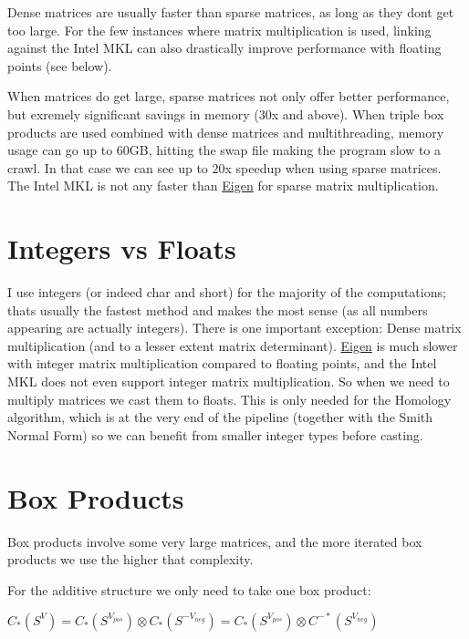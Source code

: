 \begin{DoxyItemize}
\item Dense matrices are usually faster than sparse matrices, as long as they don\textquotesingle{}t get too large. For the few instances where matrix multiplication is used, linking against the Intel M\+KL can also drastically improve performance with floating points (see below).
\item When matrices do get large, sparse matrices not only offer better performance, but exremely significant savings in memory (30x and above). When triple box products are used combined with dense matrices and multithreading, memory usage can go up to 60\+GB, hitting the swap file making the program slow to a crawl. In that case we can see up to 20x speedup when using sparse matrices. The Intel M\+KL is not any faster than \hyperlink{namespaceEigen}{Eigen} for sparse matrix multiplication.
\end{DoxyItemize}\hypertarget{perf_intvsfloat}{}\section{Integers vs Floats}\label{perf_intvsfloat}
I use integers (or indeed {\ttfamily char} and {\ttfamily short}) for the majority of the computations; that\textquotesingle{}s usually the fastest method and makes the most sense (as all numbers appearing are actually integers). There is one important exception\+: Dense matrix multiplication (and to a lesser extent matrix determinant). \hyperlink{namespaceEigen}{Eigen} is much slower with integer matrix multiplication compared to floating points, and the Intel M\+KL does not even support integer matrix multiplication. So when we need to multiply matrices we cast them to floats. This is only needed for the Homology algorithm, which is at the very end of the pipeline (together with the Smith Normal Form) so we can benefit from smaller integer types before casting.\hypertarget{perf_boxproducts}{}\section{Box Products}\label{perf_boxproducts}
Box products involve some very large matrices, and the more iterated box products we use the higher that complexity.


\begin{DoxyItemize}
\item For the additive structure we only need to take one box product\+:

$C_*(S^V)=C_*(S^{V_{pos}})\otimes C_*(S^{-V_{neg}})=C_*(S^{V_{pos}})\otimes C^{-*}(S^{V_{neg}})$
\end{DoxyItemize}

